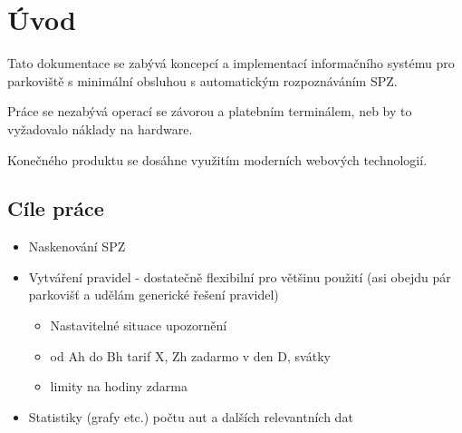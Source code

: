 \chapter{Úvod} \label{uvod}

Tato dokumentace se zabývá koncepcí a implementací informačního systému pro
parkoviště s minimální obsluhou s automatickým rozpoznáváním SPZ.

Práce se nezabývá operací se závorou a platebním terminálem, neb by to vyžadovalo náklady na hardware.

Konečného produktu se dosáhne využitím moderních webových technologií.

\section{Cíle práce}

\begin{itemize}
  \item Naskenování SPZ
  \item Vytváření pravidel - dostatečně flexibilní pro většinu použití (asi obejdu pár parkovišť a udělám generické řešení pravidel)
    \begin{itemize}
      \item Nastavitelné situace upozornění
      \item od Ah do Bh tarif X, Zh zadarmo v den D, svátky
      \item limity na hodiny zdarma
    \end{itemize}
  \item Statistiky (grafy etc.) počtu aut a dalších relevantních dat
  \end{itemize}
